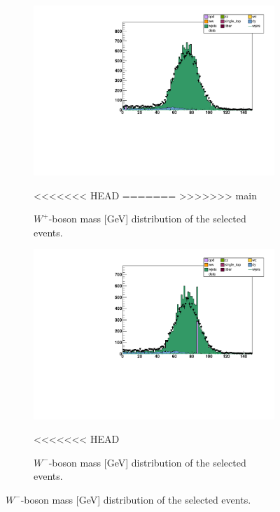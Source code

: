 \documentclass[%
 reprint,
 amsmath,amssymb,
 aps,
]{revtex4-2}
\begin{document}
\begin{figure}
        \centering
        \begin{subfigure}[b]{0.475\textwidth}
            \centering
            \includegraphics[width=\textwidth]{Plots/part2/W_mass_p.pdf}
            \caption{$W^+$-boson mass [GeV] distribution of the selected events.}    
<<<<<<< HEAD
            \label{fig:W_asym_a}
=======
            \label{fig:mean and std of net14}
>>>>>>> main
        \end{subfigure}
        \hfill
        \begin{subfigure}[b]{0.475\textwidth}  
            \centering 
            \includegraphics[width=\textwidth]{Plots/part2/W_mass_n.pdf}
            \caption{$W^-$-boson mass [GeV] distribution of the selected events.}    
<<<<<<< HEAD
            \label{fig:W_asym_b}

\end{subfigure}
\end{figure}
\end{document}
